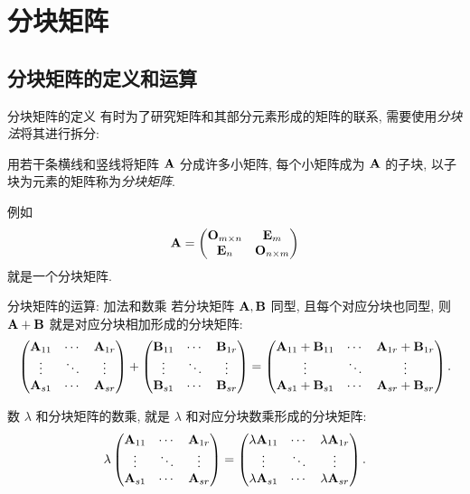 \section{分块矩阵}

\subsection{分块矩阵的定义和运算}

\begin{frame}{分块矩阵的定义}
	\onslide<+->
	有时为了研究矩阵和其部分元素形成的矩阵的联系, 需要使用\emph{分块法}将其进行拆分:
	\onslide<+->
	\begin{definition}
		用若干条横线和竖线将矩阵 ${\mathbf{A}}$ 分成许多小矩阵, 每个小矩阵成为 ${\mathbf{A}}$ 的子块, 以子块为元素的矩阵称为\emph{分块矩阵}.
	\end{definition}
	\onslide<+->
	例如
	\[{\mathbf{A}}=\begin{pmatrix}
		{\mathbf{O}}_{m\times n}&{\mathbf{E}}_m\\
		{\mathbf{E}}_n&{\mathbf{O}}_{n\times m}
	\end{pmatrix}\]
	就是一个分块矩阵.
\end{frame}


\begin{frame}{分块矩阵的运算: 加法和数乘}
	\onslide<+->
	若分块矩阵 ${\mathbf{A}},{\mathbf{B}}$ 同型, 且每个对应分块也同型, 则 ${\mathbf{A}}+{\mathbf{B}}$ 就是对应分块相加形成的分块矩阵:
	\[\begin{pmatrix}
		{\mathbf{A}}_{11}&\cdots&{\mathbf{A}}_{1r}\\
		\vdots&\ddots&\vdots\\
		{\mathbf{A}}_{s1}&\cdots&{\mathbf{A}}_{sr}
	\end{pmatrix}+\begin{pmatrix}
		{\mathbf{B}}_{11}&\cdots&{\mathbf{B}}_{1r}\\
		\vdots&\ddots&\vdots\\
		{\mathbf{B}}_{s1}&\cdots&{\mathbf{B}}_{sr}
	\end{pmatrix}=\begin{pmatrix}
		{\mathbf{A}}_{11}+{\mathbf{B}}_{11}&\cdots&{\mathbf{A}}_{1r}+{\mathbf{B}}_{1r}\\
		\vdots&\ddots&\vdots\\
		{\mathbf{A}}_{s1}+{\mathbf{B}}_{s1}&\cdots&{\mathbf{A}}_{sr}+{\mathbf{B}}_{sr}
	\end{pmatrix}.\]

	\onslide<+->
	数 $\lambda$ 和分块矩阵的数乘, 就是 $\lambda$ 和对应分块数乘形成的分块矩阵:
	\[\lambda\begin{pmatrix}
		{\mathbf{A}}_{11}&\cdots&{\mathbf{A}}_{1r}\\
		\vdots&\ddots&\vdots\\
		{\mathbf{A}}_{s1}&\cdots&{\mathbf{A}}_{sr}
	\end{pmatrix}=\begin{pmatrix}
		\lambda{\mathbf{A}}_{11}&\cdots&\lambda{\mathbf{A}}_{1r}\\
		\vdots&\ddots&\vdots\\
		\lambda{\mathbf{A}}_{s1}&\cdots&\lambda{\mathbf{A}}_{sr}
	\end{pmatrix}.\]
\end{frame}


